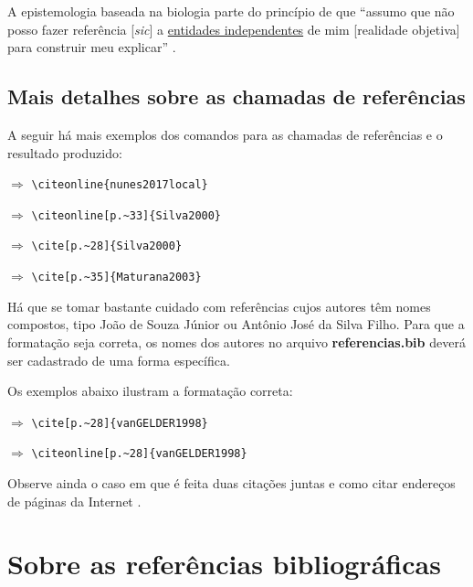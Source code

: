 \begin{apendicesenv}
    A epistemologia baseada na biologia parte do princípio de que ``assumo que não posso fazer referência [\textit{sic}] a \underline{entidades independentes} de mim [realidade objetiva] para construir meu explicar'' \cite[p.~35, comentários e grifo nosso]{Maturana2003}.

    \section{Mais detalhes sobre as chamadas de referências}
    \label{sec_chamadas_referencias}

    A seguir há mais exemplos dos comandos para as chamadas de referências e o resultado produzido:

     $\Longrightarrow$ \verb|\citeonline{nunes2017local}|

     $\Longrightarrow$ \verb|\citeonline[p.~33]{Silva2000}|

    \cite[p.~28]{Silva2000} $\Longrightarrow$ \verb|\cite[p.~28]{Silva2000}|

    \cite[p.~35]{Maturana2003} $\Longrightarrow$ \verb|\cite[p.~35]{Maturana2003}|

    \vspace{4ex}

    Há que se tomar bastante cuidado com referências cujos autores têm nomes compostos, tipo João de Souza Júnior ou Antônio José da Silva Filho.
    Para que a formatação seja correta, os nomes dos autores no arquivo \textbf{referencias.bib} deverá ser cadastrado de uma forma específica.

    Os exemplos abaixo ilustram a formatação correta:

    \cite[p.~28]{vanGELDER1998} $\Longrightarrow$ \verb|\cite[p.~28]{vanGELDER1998}|

     $\Longrightarrow$ \verb|\citeonline[p.~28]{vanGELDER1998}|

    \vspace{4ex}

    Observe ainda o caso em que é feita duas citações juntas \cite{Silva2000, nunes2017local} e como citar endereços de páginas da Internet \cite{IRL2014}.


    \chapter{Sobre as referências bibliográficas}
    \label{chap_sobre_as_referencias_bibliograficas}


\end{apendicesenv}
